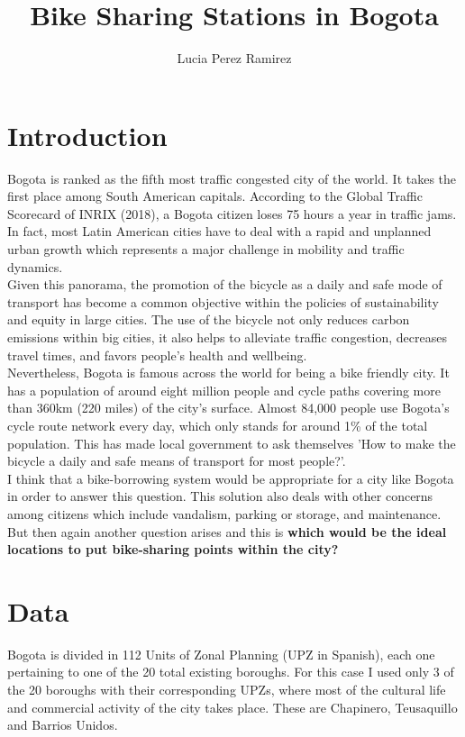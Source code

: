 \documentclass[11pt]{article}
\title{\textbf{Bike Sharing Stations in Bogota}}
\author{Lucia Perez Ramirez}
\date{}                                           %
\begin{document}
\maketitle
\section{Introduction}
Bogota is ranked as the fifth most traffic congested city of the world. It takes the first place among South American capitals. According to the Global Traffic Scorecard of INRIX (2018), a Bogota citizen loses 75 hours a year in traffic jams. In fact, most Latin American cities have to deal with a rapid and unplanned urban growth which represents a major challenge in mobility and traffic dynamics.\\

Given this panorama, the promotion of the bicycle as a daily and safe mode of transport has become a common objective within the policies of sustainability and equity in large cities. The use of the bicycle not only reduces carbon emissions within big cities, it also helps to alleviate traffic congestion, decreases travel times, and favors people's health and wellbeing.\\

Nevertheless, Bogota is famous across the world for being a bike friendly city. It has a population of around eight million people and cycle paths covering more than 360km (220 miles) of the city’s surface. Almost 84,000 people use Bogota’s cycle route network every day, which only stands for around 1\% of the total population. This has made local government to ask themselves 'How to make the bicycle a daily and safe means of transport for most people?'.\\

I think that a bike-borrowing system would be appropriate for a city like Bogota in order to answer this question. This solution also deals with other concerns among citizens which include vandalism, parking or storage, and maintenance.\\

But then again another question arises and this is \textbf{which would be the ideal locations to put bike-sharing points within the city?}

\section{Data}
Bogota is divided in 112 Units of Zonal Planning (UPZ in Spanish), each one pertaining to one of the 20 total existing boroughs. For this case I used only 3 of the 20 boroughs with their corresponding UPZs, where most of the cultural life and commercial activity of the city takes place. These are Chapinero, Teusaquillo and Barrios Unidos. \\
\end{document}
